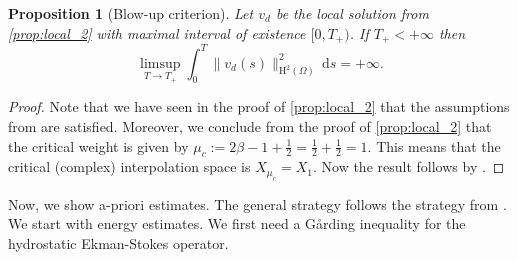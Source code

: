 \documentclass[preprint]{elsarticle}
\newtheorem{prop}[prop]{Proposition}
\numberwithin{equation}{section}
\renewcommand{\d}{\, \mathrm{d}}
\renewcommand{\H}{\mathrm{H}}
\newcommand{\rH}{\H}
\begin{document}
\begin{prop}[Blow-up criterion]
	\label{cor:blow-up_2}
	Let $v_d$ be the local solution from \autoref{prop:local_2} with maximal interval of existence $[0,T_+)$. If $T_+ < +\infty$ then 
	\begin{equation*}
		\limsup_{T \to T_+} \int_0^T \|v_d(s)\|_{\rH^{2}(\Omega)}^2 \d s = +\infty . 
	\end{equation*}
\end{prop}
\begin{proof}
	Note that we have seen in the proof of \autoref{prop:local_2} that the assumptions from \cite{PWS:18_2} are satisfied.
	Moreover, we conclude from the proof of \autoref{prop:local_2} that the critical weight is given by
	$\mu_c := 2 \beta - 1+\frac{1}{2} = \frac{1}{2}+ \frac{1}{2}=1$. This means that the critical (complex) interpolation space is $X_{\mu_c} = X_1$. Now the result follows by \cite[Theorem 2.4]{PWS:18_2}. %
\end{proof}

Now, we show a-priori estimates. The general strategy follows the strategy from \cite{HK:16_2, GGHHK:20_2}. 
We start with energy estimates. 
We first need a G\aa rding inequality for the hydrostatic Ekman-Stokes operator. 
\end{document}
